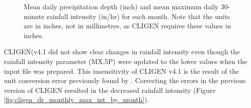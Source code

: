 \begin{figure}[htbp]
  \centering
  \caption[Mean daily precipitation depth and mean maximum daily 30-minute
rainfall intensity for each month]{Mean daily precipitation depth (inch) and
mean maximum daily 30-minute rainfall intensity (in/hr) for each month. Note
that the units are in inches, not in millimetres, as CLIGEN requires these
values in inches.}
  \label{fig:mean_p_mx5p_cligen}
\end{figure}

CLIGEN(v4.1 did not show clear changes in rainfall intensity even though
the rainfall intensity parameter ({MX.5P}) were updated to the lower values when
the input file was prepared. This insensitivity of CLIGEN v4.1 is the
result of the unit conversion error previously found by \citet{yu2000-301}.
Correcting the errors in the previous version of CLIGEN resulted in the
decreased rainfall intensity (Figure
\ref{fig:cligen_dr_monthly_max_int_by_month}).

